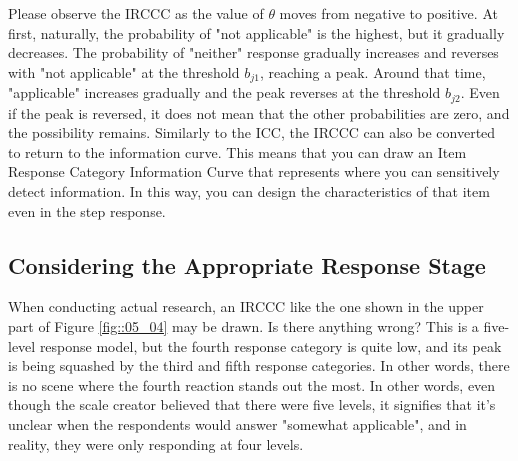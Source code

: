 \documentclass{ltjsbook}
\begin{document}


Please observe the IRCCC as the value of $\theta$ moves from negative to positive. At first, naturally, the probability of "not applicable" is the highest, but it gradually decreases. The probability of "neither" response gradually increases and reverses with "not applicable" at the threshold $b_{j1}$, reaching a peak. Around that time, "applicable" increases gradually and the peak reverses at the threshold $b_{j2}$. Even if the peak is reversed, it does not mean that the other probabilities are zero, and the possibility remains.
Similarly to the ICC, the IRCCC can also be converted to return to the information curve. This means that you can draw an Item Response Category Information Curve that represents where you can sensitively detect information. In this way, you can design the characteristics of that item even in the step response.

\subsection{Considering the Appropriate Response Stage}
When conducting actual research, an IRCCC like the one shown in the upper part of Figure \ref{fig::05_04} may be drawn. Is there anything wrong?
This is a five-level response model, but the fourth response category is quite low, and its peak is being squashed by the third and fifth response categories. In other words, there is no scene where the fourth reaction stands out the most. In other words, even though the scale creator believed that there were five levels, it signifies that it's unclear when the respondents would answer "somewhat applicable", and in reality, they were only responding at four levels.
\end{document}
